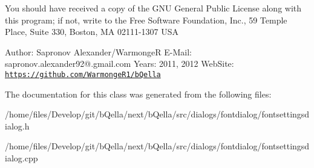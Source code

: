 You should have received a copy of the GNU General Public License along with this program; if not, write to the Free Software Foundation, Inc., 59 Temple Place, Suite 330, Boston, MA 02111-\/1307 USA

Author: Sapronov Alexander/WarmongeR E-\/Mail: sapronov.alexander92@.gmail.com Years: 2011, 2012 WebSite: \href{https://github.com/WarmongeR1/bQella}{\tt https://github.com/WarmongeR1/bQella} 

The documentation for this class was generated from the following files:\begin{DoxyCompactItemize}
\item 
/home/files/Develop/git/bQella/next/bQella/src/dialogs/fontdialog/fontsettingsdialog.h\item 
/home/files/Develop/git/bQella/next/bQella/src/dialogs/fontdialog/fontsettingsdialog.cpp\end{DoxyCompactItemize}
